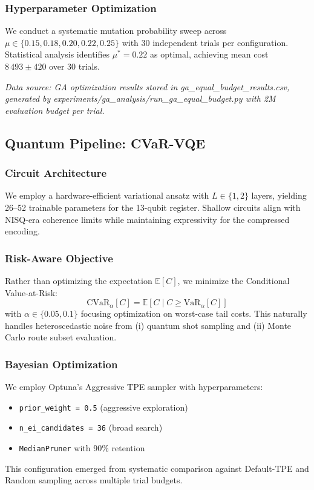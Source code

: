 \subsubsection{Hyperparameter Optimization}
We conduct a systematic mutation probability sweep across $\mu \in \{0.15, 0.18, 0.20, 0.22, 0.25\}$ with 30 independent trials per configuration.
Statistical analysis identifies $\mu^* = 0.22$ as optimal, achieving mean cost $8\,493 \pm 420$ over 30 trials.

\textit{Data source: GA optimization results stored in ga\_equal\_budget\_results.csv, generated by experiments/ga\_analysis/run\_ga\_equal\_budget.py with 2M evaluation budget per trial.}

\subsection{Quantum Pipeline: CVaR-VQE}

\subsubsection{Circuit Architecture}
We employ a hardware-efficient variational ansatz with $L \in \{1, 2\}$ layers, yielding 26--52 trainable parameters for the 13-qubit register.
Shallow circuits align with NISQ-era coherence limits while maintaining expressivity for the compressed encoding.

\subsubsection{Risk-Aware Objective}
Rather than optimizing the expectation $\mathbb{E}[C]$, we minimize the Conditional Value-at-Risk:
\[
\text{CVaR}_\alpha[C] = \mathbb{E}[C \mid C \geq \text{VaR}_\alpha[C]]
\]
with $\alpha \in \{0.05, 0.1\}$ focusing optimization on worst-case tail costs.
This naturally handles heteroscedastic noise from (i) quantum shot sampling and (ii) Monte Carlo route subset evaluation.

\subsubsection{Bayesian Optimization}
We employ Optuna's Aggressive TPE sampler with hyperparameters:
\begin{itemize}[nosep]
    \item \texttt{prior\_weight = 0.5} (aggressive exploration)
    \item \texttt{n\_ei\_candidates = 36} (broad search)
    \item \texttt{MedianPruner} with 90\% retention
\end{itemize}
This configuration emerged from systematic comparison against Default-TPE and Random sampling across multiple trial budgets.

